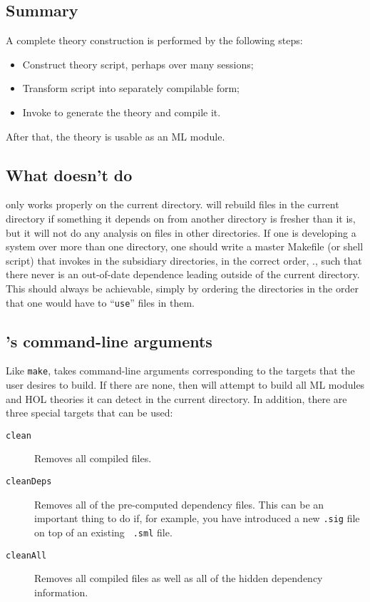 \subsection{Summary}

A complete theory construction is performed by the following steps:
\begin{itemize}
\item Construct theory script, perhaps over many sessions;
\item Transform script into separately compilable form;
\item Invoke \holmake{} to generate the theory and compile it.
\end{itemize}

After that, the theory is usable as an ML module.

\subsection{What \holmake{} doesn't do}

\holmake{} only works properly on the current directory.  \holmake{}
will rebuild files in the current directory if something it depends on
from another directory is fresher than it is, but it will not do any
analysis on files in other directories.  If one is developing a system
over more than one directory, one should write a master Makefile (or
shell script) that invokes \holmake{} in the subsidiary
directories, in the correct order, \ie., such that there never is an
out-of-date dependence leading outside of the current directory. This
should always be achievable, simply by ordering the directories in the
order that one would have to ``\verb+use+'' files in them.

\subsection{\holmake{}'s command-line arguments}

Like {\tt make}, \holmake{} takes command-line arguments
corresponding to the targets that the user desires to build.  If there
are none, then \holmake{} will attempt to build all ML modules and
HOL theories it can detect in the current directory.  In addition,
there are three special targets that can be used:
\begin{description}
\item[{\tt clean}] Removes all compiled files.
\item [{\tt cleanDeps}] Removes all of the pre-computed dependency
  files.  This can be an important thing to do if, for example, you
  have introduced a new {\tt .sig} file on top of an existing {\tt
  .sml} file.
\item [{\tt cleanAll}] Removes all compiled files as well as all of
  the hidden dependency information.
\end{description}

